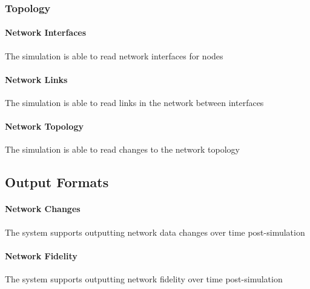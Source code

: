 \documentclass[titlepage]{article}
\begin{document}
\subsubsection{Topology}
    \paragraph{Network Interfaces} The simulation is able to read network interfaces for nodes
    \paragraph{Network Links} The simulation is able to read links in the network between interfaces
    \paragraph{Network Topology} The simulation is able to read changes to the network topology



\subsection{Output Formats%
  \label{output-formats}%
}

    \paragraph{Network Changes} The system supports outputting network data changes over time post-simulation
    \paragraph{Network Fidelity} The system supports outputting network fidelity over time post-simulation
\end{document}
